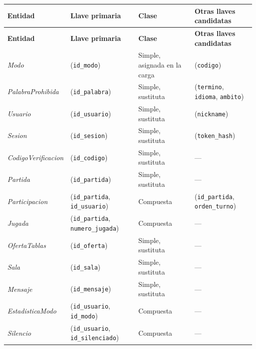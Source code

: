\begin{center}\small
\begin{longtable}{|L{0.21\textwidth}|L{0.28\textwidth}|L{0.18\textwidth}|L{0.21\textwidth}|}
\hline
\textbf{Entidad} & \textbf{Llave primaria} & \textbf{Clase} & \textbf{Otras llaves candidatas} \\ \hline
\endfirsthead
\hline
\textbf{Entidad} & \textbf{Llave primaria} & \textbf{Clase} & \textbf{Otras llaves candidatas} \\ \hline
\endhead
\textit{Modo} & (\texttt{id\_\allowbreak{}modo}) & Simple, asignada en la carga & (\texttt{codigo}) \\ \hline
\textit{Palabra\-Prohibida} & (\texttt{id\_\allowbreak{}palabra}) & Simple, sustituta & (\texttt{termino}, \texttt{idioma}, \texttt{ambito}) \\ \hline
\textit{Usuario} & (\texttt{id\_\allowbreak{}usuario}) & Simple, sustituta & (\texttt{nickname}) \\ \hline
\textit{Sesion} & (\texttt{id\_\allowbreak{}sesion}) & Simple, sustituta & (\texttt{token\_\allowbreak{}hash}) \\ \hline
\textit{Codigo\-Verificacion} & (\texttt{id\_\allowbreak{}codigo}) & Simple, sustituta & --- \\ \hline
\textit{Partida} & (\texttt{id\_\allowbreak{}partida}) & Simple, sustituta & --- \\ \hline
\textit{Participacion} & (\texttt{id\_\allowbreak{}partida}, \texttt{id\_\allowbreak{}usuario}) & Compuesta & (\texttt{id\_\allowbreak{}partida}, \texttt{orden\_\allowbreak{}turno}) \\ \hline
\textit{Jugada} & (\texttt{id\_\allowbreak{}partida}, \texttt{numero\_\allowbreak{}jugada}) & Compuesta & --- \\ \hline
\textit{Oferta\-Tablas} & (\texttt{id\_\allowbreak{}oferta}) & Simple, sustituta & --- \\ \hline
\textit{Sala} & (\texttt{id\_\allowbreak{}sala}) & Simple, sustituta & --- \\ \hline
\textit{Mensaje} & (\texttt{id\_\allowbreak{}mensaje}) & Simple, sustituta & --- \\ \hline
\textit{Estadistica\-Modo} & (\texttt{id\_\allowbreak{}usuario}, \texttt{id\_\allowbreak{}modo}) & Compuesta & --- \\ \hline
\textit{Silencio} & (\texttt{id\_\allowbreak{}usuario}, \texttt{id\_\allowbreak{}silenciado}) & Compuesta & --- \\ \hline

\end{longtable}
\end{center}
